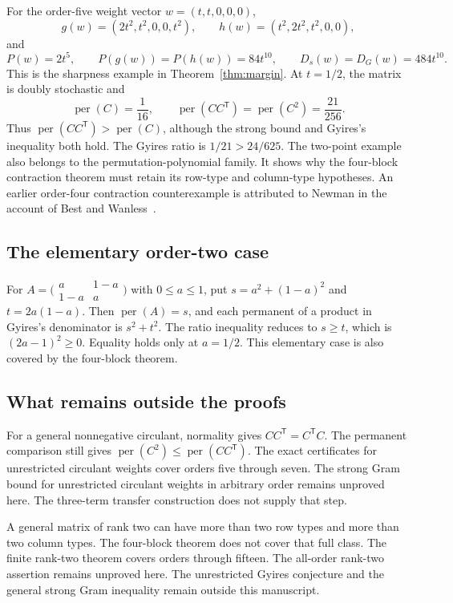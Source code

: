 \documentclass[11pt,a4paper]{article}
\theoremstyle{definition}
\theoremstyle{remark}
\newcommand{\per}{\operatorname{per}}
\newcommand{\T}{\mathsf{T}}
\begin{document}
For the order-five weight vector $w=(t,t,0,0,0)$,
\[
g(w)=(2t^2,t^2,0,0,t^2),\qquad h(w)=(t^2,2t^2,t^2,0,0),
\]
and
\[
P(w)=2t^5,\qquad P(g(w))=P(h(w))=84t^{10},\qquad D_s(w)=D_G(w)=484t^{10}.
\]
This is the sharpness example in Theorem~\ref{thm:margin}.
At $t=1/2$, the matrix is doubly stochastic and
\[
\per(C)=\frac1{16},\qquad \per(CC^\T)=\per(C^2)=\frac{21}{256}.
\]
Thus $\per(CC^\T)>\per(C)$, although the strong bound and Gyires's inequality both hold.
The Gyires ratio is $1/21>24/625$.
The two-point example also belongs to the permutation-polynomial family.
It shows why the four-block contraction theorem must retain its row-type and column-type hypotheses.
An earlier order-four contraction counterexample is attributed to Newman in the account of Best and Wanless~\cite{bw}.

\subsection{The elementary order-two case}

For
$A=\bigl(\begin{smallmatrix}a&1-a\\1-a&a\end{smallmatrix}\bigr)$ with $0\le a\le1$, put
$s=a^2+(1-a)^2$ and $t=2a(1-a)$.
Then $\per(A)=s$, and each permanent of a product in Gyires's denominator is $s^2+t^2$.
The ratio inequality reduces to $s\ge t$, which is $(2a-1)^2\ge0$.
Equality holds only at $a=1/2$.
This elementary case is also covered by the four-block theorem.

\subsection{What remains outside the proofs}\label{sec:outside}

For a general nonnegative circulant, normality gives $CC^\T=C^\T C$.
The permanent comparison still gives $\per(C^2)\le\per(CC^\T)$.
The exact certificates for unrestricted circulant weights cover orders five through seven. The strong Gram bound for unrestricted circulant weights in arbitrary order remains unproved here.
The three-term transfer construction does not supply that step.

A general matrix of rank two can have more than two row types and more than two column types.
The four-block theorem does not cover that full class. The finite rank-two theorem covers orders through fifteen. The all-order rank-two assertion remains unproved here.
The unrestricted Gyires conjecture and the general strong Gram inequality remain outside this manuscript.
\end{document}
